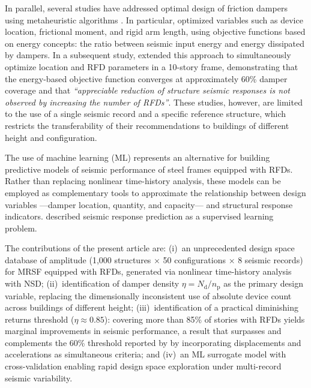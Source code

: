 \documentclass[preprint,12pt,authoryear]{elsarticle}
\newcommand{\nd}{N_{\mathrm{d}}}
\newcommand{\np}{n_{\mathrm{p}}}              %
\newcommand{\etad}{\eta}
\begin{document}
In parallel, several studies have addressed optimal design of friction dampers using
metaheuristic algorithms \citep{moreschi_design_2003, moghaddam_optimal_2022, miguel_simultaneous_2016,
ontiveros-perez_reliability-based_2019}. In particular, \citet{Jarrahi2020jbe} optimized
variables such as device location, frictional moment, and rigid arm length, using objective
functions based on energy concepts: the ratio between seismic input energy and energy dissipated
by dampers. In a subsequent study, \citet{Jarrahi2020sdee} extended this approach to simultaneously
optimize location and RFD parameters in a 10-story frame, demonstrating that the energy-based
objective function converges at approximately 60\% damper coverage and that \textit{``appreciable
reduction of structure seismic responses is not observed by increasing the number of RFDs''}. These
studies, however, are limited to the use of a single seismic record and a specific reference structure,
which restricts the transferability of their recommendations to buildings of different height and configuration.

The use of machine learning (ML) represents an alternative for building predictive models of seismic
performance of steel frames equipped with RFDs. Rather than replacing nonlinear time-history analysis,
these models can be employed as complementary tools to approximate the relationship between design
variables ---damper location, quantity, and capacity--- and structural response indicators. \citet{Kazemi2022}
described seismic response prediction as a supervised learning problem.

The contributions of the present article are: (i)~an unprecedented design space database of amplitude
(1,000 structures $\times$ 50 configurations $\times$ 8 seismic records) for MRSF equipped with RFDs,
generated via nonlinear time-history analysis with NSD; (ii)~identification of damper density
$\etad = \nd/\np$ as the primary design variable, replacing the dimensionally inconsistent use of
absolute device count across buildings of different height; (iii)~identification of a practical
diminishing returns threshold ($\etad \approx 0.85$): covering more than 85\% of stories with RFDs
yields marginal improvements in seismic performance, a result that surpasses and complements the
60\% threshold reported by \citet{Jarrahi2020sdee} by incorporating displacements and accelerations
as simultaneous criteria; and (iv)~an ML surrogate model with cross-validation enabling rapid
design space exploration under multi-record seismic variability.
\end{document}
